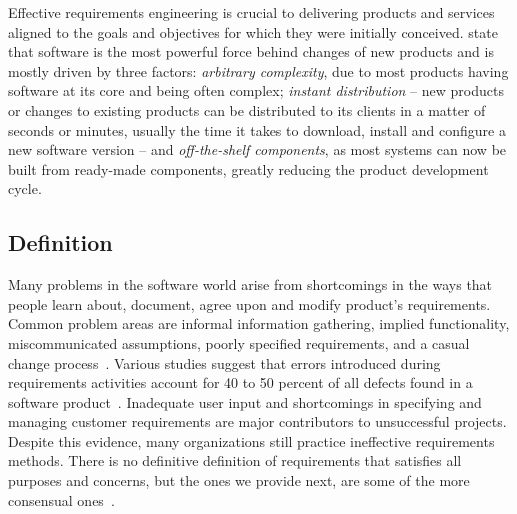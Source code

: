 \documentclass[dissertation,final]{softeng}
\begin{document}
Effective requirements engineering is crucial to delivering products and services aligned to the goals and objectives for which they were initially conceived. \citet{Hull2011} state that software is the most powerful force behind changes of new products and is mostly driven by three factors: \emph{arbitrary complexity}, due to most products having software at its core and being often complex; \emph{instant distribution} -- new products or changes to existing products can be distributed to its clients in a matter of seconds or minutes, usually the time it takes to download, install and configure a new software version -- and \emph{off-the-shelf components}, as most systems can now be built from ready-made components, greatly reducing the product development cycle.

\subsection{Definition}
Many problems in the software world arise from shortcomings in the ways that people learn about, document, agree upon and modify product's requirements. Common problem areas are informal information gathering, implied functionality, miscommunicated assumptions, poorly specified requirements, and a casual change process~\citep{Wiegers2013}. Various studies suggest that errors introduced during requirements activities account for 40 to 50 percent of all defects found in a software product~\citep{Davis200505}. Inadequate user input and shortcomings in specifying and managing customer requirements are major contributors to unsuccessful projects. Despite this evidence, many organizations still practice ineffective requirements methods. There is no definitive definition of requirements that satisfies all purposes and concerns, but the ones we provide next, are some of the more consensual ones~\citep{Wiegers2013}.
\end{document}
